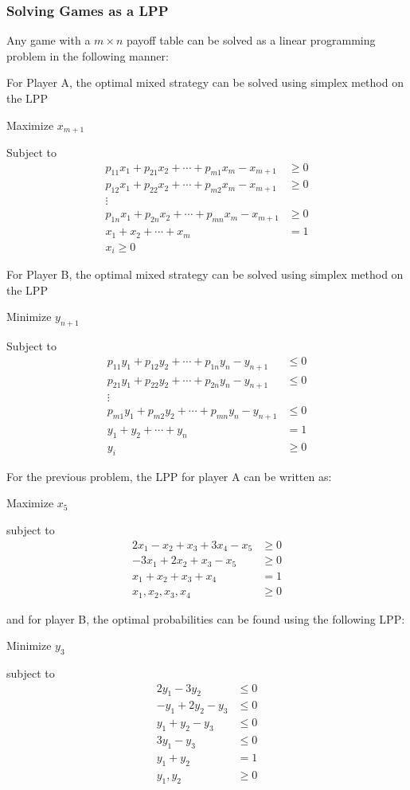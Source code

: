 \documentclass[12pt]{article}
\begin{document}
\subsubsection{Solving Games as a LPP}
Any game with a $m\times n$ payoff table can be solved as a linear programming problem in the following manner:

For Player A, the optimal mixed strategy can be solved using simplex method on the LPP

Maximize $x_{m+1}$

Subject to 
\begin{align*}
  p_{11} x_1 + p_{21} x_2 + \cdots +p_{m1} x_m - x_{m+1} & \ge 0 \\
  p_{12} x_1 + p_{22} x_2 + \cdots +p_{m2} x_m - x_{m+1} & \ge 0 \\
  \vdots                                                         \\
  p_{1n} x_1 + p_{2n} x_2 + \cdots +p_{mn} x_m - x_{m+1} & \ge 0 \\
  x_1+x_2+\cdots+x_m                                  & = 1   \\
  x_i \ge 0 \tag{for $i=1,2,\ldots ,m$}
\end{align*}

For Player B, the optimal mixed strategy can be solved using simplex method on the LPP

Minimize $y_{n+1}$

Subject to 
\begin{align*}
  p_{11} y_1 + p_{12} y_2 + \cdots +p_{1n} y_n - y_{n+1} &\le 0 \\
  p_{21} y_1 + p_{22} y_2 + \cdots +p_{2n} y_n - y_{n+1} &\le 0 \\
  \vdots \\
  p_{m1} y_1 + p_{m2} y_2 + \cdots +p_{mn} y_n - y_{n+1} &\le 0 \\
  y_1+y_2+\cdots+y_n                                  &= 1 \\
  y_i                                                &\ge 0 \tag{for $i=1,2,\ldots ,n$}
\end{align*}

For the previous problem, the LPP for player A can be written as:

Maximize  $x_5$

subject to
\begin{align*}
  2x_1-x_2+x_3+3 x_4-x_5 &\ge 0 \\
  -3x_1+2x_2+x_3-x_5     &\ge 0 \\
  x_1+x_2+x_3+x_4        &= 1 \\
  x_1,x_2,x_3,x_4        &\ge 0
\end{align*}

and for player B, the optimal probabilities can be found using the following LPP:

Minimize   $y_3$

subject to
\begin{align*}
  2y_1-3y_2     &\le 0 \\
  -y_1+2y_2-y_3 &\le 0 \\
  y_1+y_2-y_3   &\le 0 \\
  3y_1-y_3      &\le 0 \\
  y_1+y_2       &= 1 \\
  y_1,y_2       &\ge 0
\end{align*}
\end{document}
